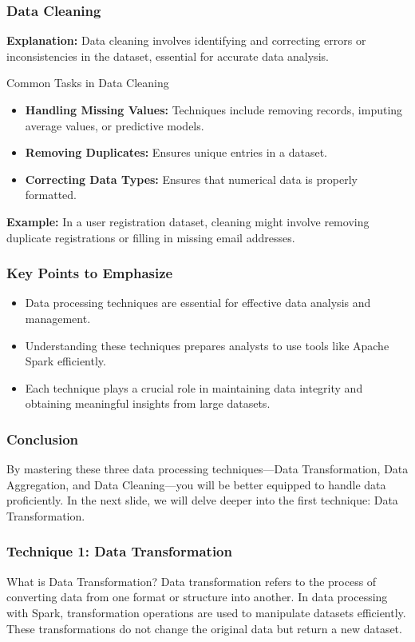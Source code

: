 \documentclass[aspectratio=169]{beamer}
\begin{document}
\begin{frame}[fragile]
    \frametitle{Data Cleaning}
    \textbf{Explanation:} Data cleaning involves identifying and correcting errors or inconsistencies in the dataset, essential for accurate data analysis.

    \begin{block}{Common Tasks in Data Cleaning}
        \begin{itemize}
            \item \textbf{Handling Missing Values:} Techniques include removing records, imputing average values, or predictive models.
            \item \textbf{Removing Duplicates:} Ensures unique entries in a dataset.
            \item \textbf{Correcting Data Types:} Ensures that numerical data is properly formatted.
        \end{itemize}
    \end{block}

    \textbf{Example:} In a user registration dataset, cleaning might involve removing duplicate registrations or filling in missing email addresses.
\end{frame}

\begin{frame}[fragile]
    \frametitle{Key Points to Emphasize}
    \begin{itemize}
        \item Data processing techniques are essential for effective data analysis and management.
        \item Understanding these techniques prepares analysts to use tools like Apache Spark efficiently.
        \item Each technique plays a crucial role in maintaining data integrity and obtaining meaningful insights from large datasets.
    \end{itemize}
\end{frame}

\begin{frame}[fragile]
    \frametitle{Conclusion}
    By mastering these three data processing techniques—Data Transformation, Data Aggregation, and Data Cleaning—you will be better equipped to handle data proficiently. In the next slide, we will delve deeper into the first technique: Data Transformation.
\end{frame}

\begin{frame}[fragile]
  \frametitle{Technique 1: Data Transformation}
  
  \begin{block}{What is Data Transformation?}
    Data transformation refers to the process of converting data from one format or structure into another. In data processing with Spark, transformation operations are used to manipulate datasets efficiently. These transformations do not change the original data but return a new dataset.
  \end{block}
  
\end{frame}
\end{document}
